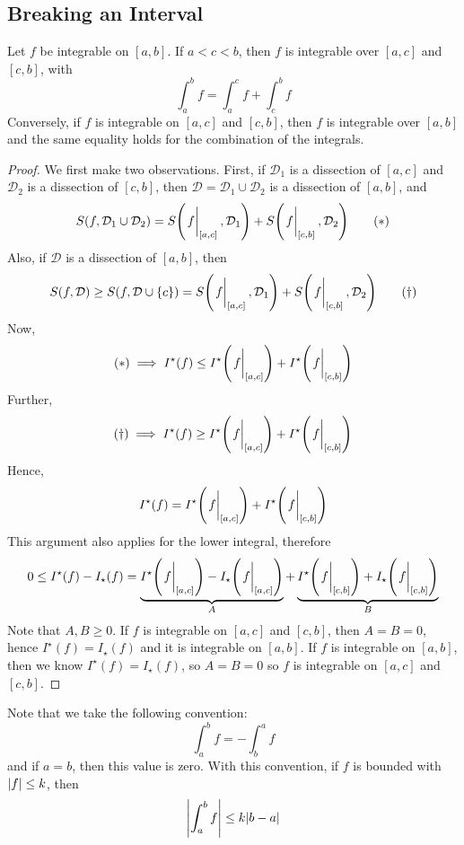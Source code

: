 \subsection{Breaking an Interval}
Let \(f\) be integrable on \([a, b]\). If \(a < c < b\), then \(f\) is integrable over \([a, c]\) and \([c, b]\), with
\[ \int_a^b f = \int_a^c f + \int_c^b f \]
Conversely, if \(f\) is integrable on \([a, c]\) and \([c, b]\), then \(f\) is integrable over \([a, b]\) and the same equality holds for the combination of the integrals.
\begin{proof}
	We first make two observations. First, if \(\mathcal D_1\) is a dissection of \([a, c]\) and \(\mathcal D_2\) is a dissection of \([c, b]\), then \(\mathcal D = \mathcal D_1 \cup \mathcal D_2\) is a dissection of \([a, b]\), and
	\begin{equation}
		S(f, \mathcal D_1 \cup \mathcal D_2) = S\qty(\eval{f}_{[a, c]}, \mathcal D_1) + S\qty(\eval{f}_{[c, b]}, \mathcal D_2)
		\tag{\(\ast\)}
	\end{equation}
	Also, if \(\mathcal D\) is a dissection of \([a, b]\), then
	\begin{equation}
		S(f, \mathcal D) \geq S(f, \mathcal D \cup \{ c \}) = S\qty(\eval{f}_{[a, c]}, \mathcal D_1) + S\qty(\eval{f}_{[c, b]}, \mathcal D_2)
		\tag{\(\dagger\)}
	\end{equation}
	Now,
	\[ (\ast) \implies I^\star(f) \leq I^\star\qty(\eval{f}_{[a, c]}) + I^\star\qty(\eval{f}_{[c, b]}) \]
	Further,
	\[ (\dagger) \implies I^\star(f) \geq I^\star\qty(\eval{f}_{[a, c]}) + I^\star\qty(\eval{f}_{[c, b]}) \]
	Hence,
	\[ I^\star(f) = I^\star\qty(\eval{f}_{[a, c]}) + I^\star\qty(\eval{f}_{[c, b]}) \]
	This argument also applies for the lower integral, therefore
	\[ 0 \leq I^\star(f) - I_\star(f) = \underbrace{I^\star\qty(\eval{f}_{[a, c]}) - I_\star\qty(\eval{f}_{[a, c]})}_{A} + \underbrace{I^\star\qty(\eval{f}_{[c, b]}) + I_\star\qty(\eval{f}_{[c, b]})}_{B} \]
	Note that \(A, B \geq 0\). If \(f\) is integrable on \([a, c]\) and \([c, b]\), then \(A = B = 0\), hence \(I^\star(f) = I_\star(f)\) and it is integrable on \([a, b]\). If \(f\) is integrable on \([a, b]\), then we know \(I^\star(f) = I_\star(f)\), so \(A = B = 0\) so \(f\) is integrable on \([a, c]\) and \([c, b]\).
\end{proof}
\noindent Note that we take the following convention:
\[ \int_a^b f = -\int_b^a f \]
and if \(a=b\), then this value is zero. With this convention, if \(f\) is bounded with \(\abs{f} \leq k\), then
\[ \abs{\int_a^b f} \leq k\abs{b - a} \]

